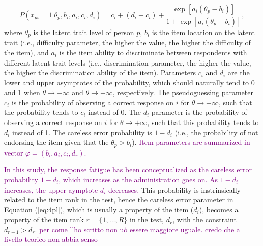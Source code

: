 \documentclass{svproc}
\newcommand{\ottavia}[1]{\textcolor{purple}{#1}}
\begin{document}
\begin{equation}\label{eq:4pl}
	P(x_{pi}= 1| \theta_p, b_i, a_i, c_i, d_i) = c_i + (d_i -c_i) + \dfrac{\exp[a_i(\theta_p - b_i)]}{1 + \exp[a_i(\theta_p - b_i)]},
\end{equation}
where $\theta_p$ is the latent trait level of person $p$, $b_i$ is the item location on the latent trait (i.e., difficulty parameter, the higher the value, the higher the difficulty of the item), and $a_i$ is the item ability to discriminate between respondents with different latent trait levels (i.e., discrimination parameter, the higher the value, the higher the discrimination ability of the item). Parameters $c_i$ and $d_i$ are the lower and upper asymptotes of the probability, which should naturally tend to 0 and 1 when $\theta \to - \infty$ and $\theta \to +\infty$, respectively. 
The pseudoguessing parameter $c_i$ is the probability of observing a correct response on $i$ for $\theta \to - \infty$, such that the probability tends to $c_i$ instead of 0. 
The $d_i$ parameter is the probability of observing a correct response on $i$ for $\theta \to + \infty$, such that this probability tends to $d_i$ instead of 1. The careless error probability is $1 - d_i$ (i.e., the probability of not endorsing the item given that the $\theta_p > b_i$).
\ottavia{Item parameters are summarized in vector $\varphi = (b_i, a_i, c_i, d_r)$.}


\ottavia{In this study, the response fatigue has been conceptualized as the careless error probability $1 - d_i$, which increases as the administration goes on. As $1 - d_i$ increases, the upper aymptote $d_i$ decreases.}
This probability is instrinsically related to the item rank in the test, hence the careless error parameter in Equation (\ref{eq:4pl}), which is usually a property of the item ($d_i$), becomes a property of the item rank $r = \{1, \ldots, R\}$ in the test, $d_r$, with the constraint $d_{r-1} > d_r$. \ottavia{per come l'ho scritto non uò essere maggiore uguale. credo che a livello teorico non abbia senso}
\normalcolor
\end{document}
